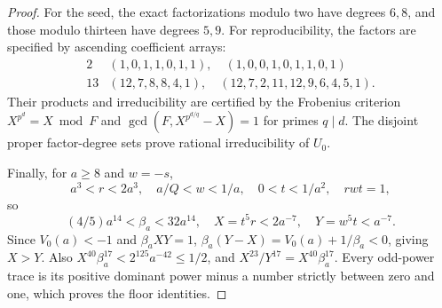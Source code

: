 \documentclass[11pt,a4paper]{article}
\theoremstyle{definition}\newtheorem{definition}[theorem]{Definition}
\theoremstyle{remark}\newtheorem{remark}[theorem]{Remark}
\begin{document}
\begin{proof}
For the seed, the exact factorizations modulo two have degrees $6,8$,
and those modulo thirteen have degrees $5,9$. For reproducibility,
the factors are specified by ascending coefficient arrays:
\[
\begin{array}{c|l}
2&(1,0,1,1,0,1,1),\quad(1,0,0,1,0,1,1,0,1)\\
13&(12,7,8,8,4,1),\quad(12,7,2,11,12,9,6,4,5,1).
\end{array}
\]
Their products and irreducibility are certified by the Frobenius
criterion $X^{p^d}=X\bmod F$ and
$\gcd(F,X^{p^{d/q}}-X)=1$ for primes $q\mid d$. The disjoint proper
factor-degree sets prove rational irreducibility of $U_0$.

Finally, for $a\ge8$ and $w=-s$,
\[
 a^3<r<2a^3,\quad a/Q<w<1/a,\quad 0<t<1/a^2,
 \quad rwt=1,
\]
so
\[
 (4/5)a^{14}<\beta_a<32a^{14},\quad
 X=t^5r<2a^{-7},\quad Y=w^5t<a^{-7}.
\]
Since $V_0(a)<-1$ and $\beta_aXY=1$,
$\beta_a(Y-X)=V_0(a)+1/\beta_a<0$, giving $X>Y$.
Also $X^{40}\beta_a^{17}<2^{125}a^{-42}\le1/2$, and
$X^{23}/Y^{17}=X^{40}\beta_a^{17}$. Every odd-power trace is its
positive dominant power minus a number strictly between zero and one,
which proves the floor identities.
\end{proof}
\end{document}
